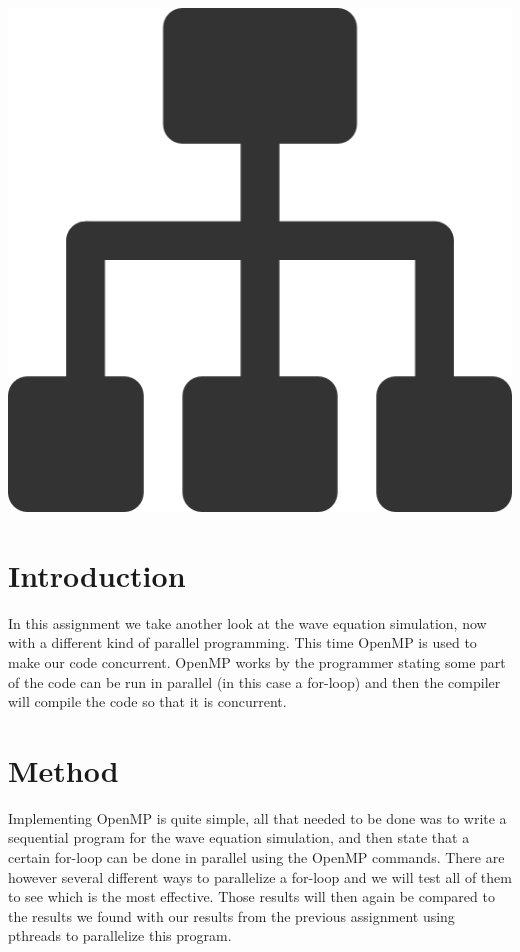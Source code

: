\documentclass[a4paper,12px]{article}
\begin{document}
\vspace{2cm}
\begin{center}
    \includegraphics[width=(\textwidth/5*3)]{parallel_tasks}
\end{center}
\clearpage

\tableofcontents
\vspace{5mm}


\section{Introduction}

In this assignment we take another look at the wave equation simulation, now
with a different kind of parallel programming. This time OpenMP is used to make
our code concurrent. OpenMP works by the programmer stating some part of the
code can be run in parallel (in this case a for-loop) and then the compiler will
compile the code so that it is concurrent.

\section{Method}

Implementing OpenMP is quite simple, all that needed to be done was to write a
sequential program for the wave equation simulation, and then state that a
certain for-loop can be done in parallel using the OpenMP commands. There are
however several different ways to parallelize a for-loop and we will test all of
them to see which is the most effective. Those results will then again be
compared to the results we found with our results from the previous assignment
using pthreads to parallelize this program.
\end{document}
